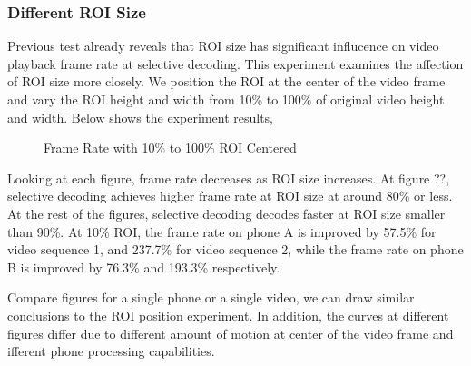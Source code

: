 \subsubsection{Different ROI Size}
Previous test already reveals that ROI size has significant influcence on video playback frame rate at selective decoding. This experiment examines the affection of ROI size more closely. We position the ROI at the center of the video frame and vary the ROI height and width from 10\% to 100\% of original video height and width. Below shows the experiment results,
\begin{figure}
\centering
\caption{Frame Rate with 10\% to 100\% ROI Centered}
\end{figure} 
Looking at each figure, frame rate decreases as ROI size increases. At figure ??, selective decoding achieves higher frame rate at ROI size at around 80\% or less. At the rest of the figures, selective decoding decodes faster at ROI size smaller than 90\%. At 10\% ROI, the frame rate on phone A is improved by 57.5\% for video sequence 1, and 237.7\% for video sequence 2, while the frame rate on phone B is improved by 76.3\% and 193.3\% respectively.  

Compare figures for a single phone or a single video, we can draw similar conclusions to the ROI position experiment. In addition, the curves at different figures differ due to different amount of motion at center of the video frame and ifferent phone processing capabilities. 


